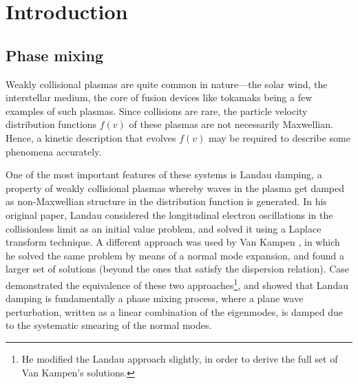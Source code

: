 \chapter{Introduction}
\label{chap:intro}
    
    \section{Phase mixing}
    \label{intro:sec:phmix}

     Weakly collisional plasmas are quite common in nature---the solar
     wind, the interstellar medium, the core of fusion devices like tokamaks being a few examples of such plasmas. Since collisions are rare,
     the particle velocity distribution functions $f(v)$ of these plasmas are not necessarily Maxwellian.
     Hence, a
     kinetic description that evolves $f(v)$  may be required to
     describe some phenomena accurately. 

	 One of
     the most important features of these systems is Landau damping, a property of
     weakly collisional plasmas whereby waves in the plasma get damped as
     non-Maxwellian structure in the distribution function is generated.  
     In his original paper, Landau \cite{landau46} considered the longitudinal
     electron oscillations \cite{tonks29} in the collisionless limit as an initial value problem, and solved it using a Laplace
     transform technique. A different approach was used by Van Kampen
     \cite{vankampen55}, in which he solved the same problem by means of a
     normal mode expansion, and found a larger set of solutions (beyond the ones that
	 satisfy the dispersion relation). Case \cite{case59} demonstrated the equivalence of these two
     approaches\footnote{He modified the Landau approach slightly, in order to derive the full set of Van
     Kampen's solutions.}, and showed that Landau damping is fundamentally a phase mixing
     process,
     where a plane wave perturbation, written as a linear combination of the eigenmodes,
	 is damped due to the systematic smearing of the normal modes.

